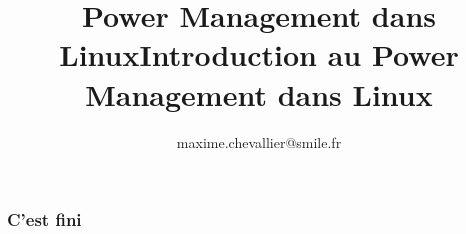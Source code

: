 \documentclass{smilebeamer}
\title{Power Management dans Linux}
\author{maxime.chevallier@smile.fr}
\begin{document}
\begin{frame}[plain]
    \title{Introduction au Power Management dans Linux}
    \titlepage
\end{frame}





\begin{frame}
	\frametitle{C'est fini}
\end{frame}
\end{document}
